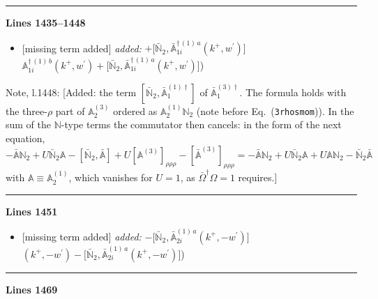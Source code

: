 \documentclass[10pt]{article}
\newenvironment{notebox}{\def\FrameCommand{{\color{notebar}\vrule width 1.5pt}\hspace{6pt}}\MakeFramed{\advance\hsize-\width\FrameRestore}\small}{\endMakeFramed}
\def\mf#1{\mathbb{#1}}
\begin{document}
\noindent\rule{\linewidth}{0.3pt}\par\noindent\textbf{Lines 1435--1448} \par
\begin{itemize}[leftmargin=2.2em,itemsep=1pt,topsep=2pt]
\item[\textbf{l.1435}] \textsf{\small [missing term added]} \emph{added:} $\displaystyle +\big[\bar{\mf{N}}_{2},\bar{\mf{A}}^{\dagger\,(1)\,a}_{1i}(k^{+},w^{\prime})\big]$$\displaystyle \mf{A}^{\dagger\, (1)\, b}_{1i}(k^{+},w^{\prime})+\big[\bar{\mf{N}}_{2},\bar{\mf{A}}^{\dagger\,(1)\,a}_{1i}(k^{+},w^{\prime})\big]${\color{gray}\small)}
\end{itemize}
\begin{notebox}\textsf{\small Note, l.1448:} [Added: the term $[\bar{\mf{N}}_2,\bar{\mf{A}}^{(1)\dagger}_1]$ of $\bar{\mf{A}}^{(3)\dagger}_1$. The formula holds with the three-$\rho$ part of $\mf{A}^{(3)}_2$ ordered as $\mf{A}^{(1)}_2\mf{N}_2$ (note before Eq.~(\texttt{3rhosmom})). In the sum of the $\mf{N}$-type terms the commutator then cancels: in the form of the next equation, $-\bar{\mf{A}}\mf{N}_2+U\bar{\mf{N}}_2\mf{A}-[\bar{\mf{N}}_2,\bar{\mf{A}}]+U[\mf{A}^{(3)}]_{\rho\rho\rho}-[\bar{\mf{A}}^{(3)}]_{\rho\rho\rho}=-\bar{\mf{A}}\mf{N}_2+U\bar{\mf{N}}_2\mf{A}+U\mf{A}\mf{N}_2-\bar{\mf{N}}_2\bar{\mf{A}}$ with $\mf{A}\equiv\mf{A}^{(1)}_2$, which vanishes for $U=1$, as $\bar\Omega^\dagger\Omega=1$ requires.]\end{notebox}
\noindent\rule{\linewidth}{0.3pt}\par\noindent\textbf{Lines 1451} \par
\begin{itemize}[leftmargin=2.2em,itemsep=1pt,topsep=2pt]
\item[\textbf{l.1451}] \textsf{\small [missing term added]} \emph{added:} $\displaystyle -\big[\bar{\mf{N}}_{2},\bar{\mf{A}}^{(1)\,a}_{2i}(k^{+},-w^{\prime})\big]$$\displaystyle (k^{+},-w^{\prime})-\big[\bar{\mf{N}}_{2},\bar{\mf{A}}^{(1)\,a}_{2i}(k^{+},-w^{\prime})\big]${\color{gray}\small)}
\end{itemize}
\noindent\rule{\linewidth}{0.3pt}\par\noindent\textbf{Lines 1469} \par
\end{document}
